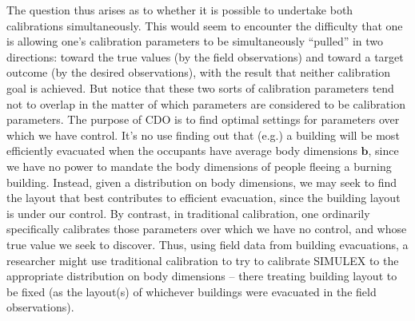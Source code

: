 \documentclass{article}
\begin{document}
The question thus arises as to whether it is possible to undertake both calibrations simultaneously. 
%
This would seem to encounter the difficulty that one is allowing one's calibration parameters to be simultaneously ``pulled'' in two directions: toward the true values (by the field observations) and toward a target outcome (by the desired observations), with the result that neither calibration goal is achieved.
%
 But notice that these two sorts of calibration parameters tend not to overlap in the matter of which parameters are considered to be calibration parameters. 
%
The purpose of CDO is to find optimal settings for parameters over which we have control. 
%
It's no use finding out that (e.g.) a building will be most efficiently evacuated when the occupants have average body dimensions $\mathbf b$, since we have no power to mandate the body dimensions of people fleeing a burning building. 
%
Instead, given a distribution on body dimensions, we may seek to find the layout that best contributes to efficient evacuation, since the building layout is under our control. 
%
By contrast, in traditional calibration, one ordinarily specifically calibrates those parameters over which we have no control, and whose true value we seek to discover. 
%
Thus, using field data from building evacuations, a researcher might use traditional calibration to try to calibrate SIMULEX to the appropriate distribution on body dimensions -- there treating building layout to be fixed (as the layout(s) of whichever buildings were evacuated in the field observations).

\end{document}
